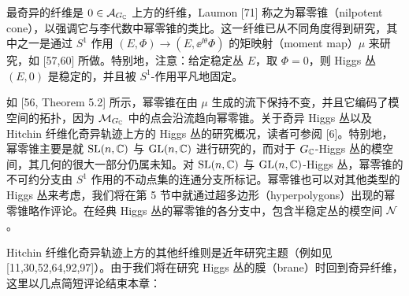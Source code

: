 

最奇异的纤维是 $0\in\mathcal{A}_{G_{\mathbb{C}}}$ 上方的纤维，Laumon [71] 称之为幂零锥（nilpotent cone），以强调它与李代数中幂零锥的类比。这一纤维已从不同角度得到研究，其中之一是通过 $S^1$ 作用 $(E,\Phi)\to(E,\ee^{\ii\theta}\Phi)$ 的矩映射（moment map）$\mu$ 来研究，如 [57,60] 所做。特别地，注意：给定稳定丛 $E$，取 $\Phi=0$，则 Higgs 丛 $(E,0)$ 是稳定的，并且被 $S^1$-作用平凡地固定。


如 [56, Theorem 5.2] 所示，幂零锥在由 $\mu$ 生成的流下保持不变，并且它编码了模空间的拓扑，因为 $\mathcal{M}_{G_{\mathbb{C}}}$ 中的点会沿流趋向幂零锥。关于奇异 Higgs 丛以及 Hitchin 纤维化奇异轨迹上方的 Higgs 丛的研究概况，读者可参阅 [6]。特别地，幂零锥主要是就 $\mathrm{SL}(n,\mathbb{C})$ 与 $\mathrm{GL}(n,\mathbb{C})$ 进行研究的，而对于 $G_{\mathbb{C}}$-Higgs 丛的模空间，其几何的很大一部分仍属未知。对 $\mathrm{SL}(n,\mathbb{C})$ 与 $\mathrm{GL}(n,\mathbb{C})$-Higgs 丛，幂零锥的不可约分支由 $S^1$ 作用的不动点集的连通分支所标记。幂零锥也可以对其他类型的 Higgs 丛来考虑，我们将在第 5 节中就通过超多边形（hyperpolygons）出现的幂零锥略作评论。在经典 Higgs 丛的幂零锥的各分支中，包含半稳定丛的模空间 $\mathcal{N}$。

Hitchin 纤维化奇异轨迹上方的其他纤维则是近年研究主题（例如见 [11,30,52,64,92,97]）。由于我们将在研究 Higgs 丛的膜（brane）时回到奇异纤维，这里以几点简短评论结束本章：

